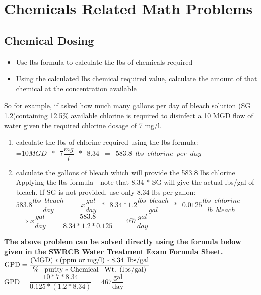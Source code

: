\section{Chemicals Related Math Problems}
\subsection{Chemical Dosing}

\begin{itemize}
\item Use lbs formula to calculate the lbs of chemicals required\\
\item Using the calculated lbs chemical required value, calculate the amount of that chemical at the concentration available
\end{itemize}

So for example, if asked how much many gallons per day of bleach solution (SG 1.2)containing 12.5\% available chlorine is required to disinfect a 10 MGD flow of water given the required chlorine dosage of 7 mg/l.\\
\begin{enumerate}
\item calculate the lbs of chlorine required using the lbs formula:\\
\vspace{0.5cm}
=$10 MGD \enspace * \enspace 7 \dfrac{mg}{l} \enspace * \enspace 8.34\enspace=\enspace 583.8 \enspace lbs \enspace chlorine \enspace per \enspace day$\\
\vspace{0.5cm}
\item calculate the gallons of bleach which will provide the 583.8 lbs chlorine\\
\vspace{0.5cm}
Applying the lbs formula - note that 8.34 * SG will give the actual lbs/gal of bleach.  If SG is not provided, use only 8.34 lbs per gallon:\\
\vspace{0.5cm}
$583.8 \dfrac{lbs \enspace bleach}{day}\enspace=\enspace x \dfrac{gal}{day} \enspace * \enspace 8.34 * 1.2 \dfrac{lbs \enspace bleach}{gal} \enspace * \enspace 0.0125 \dfrac{lbs \enspace chlorine}{lb \enspace bleach} \enspace $\\
\vspace{0.5cm}
$ \implies x \dfrac{gal}{day}\enspace = \enspace \dfrac{583.8}{8.34*1.2*0.125} \enspace = \boxed{467 \dfrac{gal}{day}}$
\end{enumerate}
\vspace{0.3cm}
\textbf{The above problem can be solved directly using the formula below given in the SWRCB Water Treatment Exam Formula Sheet.}\\
\vspace{0.3cm}
 $\textrm{GPD}=\dfrac{\textrm{(MGD)}*\textrm{(ppm or mg/l)}*8.34 \enspace \textrm{lbs/gal}}{\textrm{\% \enspace purity}*\textrm{Chemical \enspace Wt. (lbs/gal)}}$ 
 \vspace{0.3cm}
 $\textrm{GPD}=\dfrac{10*7*8.34}{0.125*(1.2*8.34)}=\boxed{467 \dfrac{\textrm{gal}}{\textrm{day}}}$ 
 

